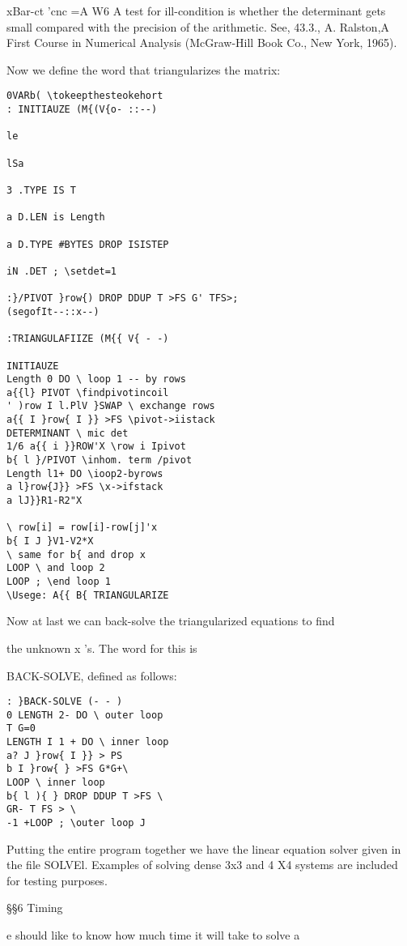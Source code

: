 {{{{{{{{{xBar-ct 'cnc =A W6
A test for ill-condition is whether the determinant gets small compared with the precision of the
arithmetic. See, 43.3., A. Ralston,A First Course in Numerical Analysis (McGraw-Hill Book Co.,
New York, 1965).


Now we define the word that triangularizes the matrix:
\begin{verbatim}
0VARb( \tokeepthesteokehort
: INITIAUZE (M{(V{o- ::--)

le

lSa

3 .TYPE IS T

a D.LEN is Length

a D.TYPE #BYTES DROP ISISTEP

iN .DET ; \setdet=1

:}/PIVOT }row{) DROP DDUP T >FS G' TFS>;
(segofIt--::x--)

:TRIANGULAFIIZE (M{{ V{ - -)

INITIAUZE
Length 0 DO \ loop 1 -- by rows
a{{l} PIVOT \findpivotincoil
' )row I l.PlV }SWAP \ exchange rows
a{{ I }row{ I }} >FS \pivot->iistack
DETERMINANT \ mic det
1/6 a{{ i }}ROW'X \row i Ipivot
b{ l }/PIVOT \inhom. term /pivot
Length l1+ DO \ioop2-byrows
a l}row{J}} >FS \x->ifstack
a lJ}}R1-R2"X

\ row[i] = row[i]-row[j]'x
b{ I J }V1-V2*X
\ same for b{ and drop x
LOOP \ and loop 2
LOOP ; \end loop 1
\Usege: A{{ B{ TRIANGULARIZE
\end{verbatim}

Now at last we can back-solve the triangularized equations to find

the unknown x 's. The word for this is }BACK-SOLVE, defined
as follows:


\begin{verbatim}
: }BACK-SOLVE (- - )
0 LENGTH 2- DO \ outer loop
T G=0
LENGTH I 1 + DO \ inner loop
a? J }row{ I }} > PS
b I }row{ } >FS G*G+\
LOOP \ inner loop
b{ l ){ } DROP DDUP T >FS \
GR- T FS > \
-1 +LOOP ; \outer loop J
\end{verbatim} 

Putting the entire program together we have the linear equation
solver given in the file SOLVEl. Examples of solving dense 3x3
and 4 X4 systems are included for testing purposes.

\S\S6 Timing

e should like to know how much time it will take to solve a

}}}}}}}}
